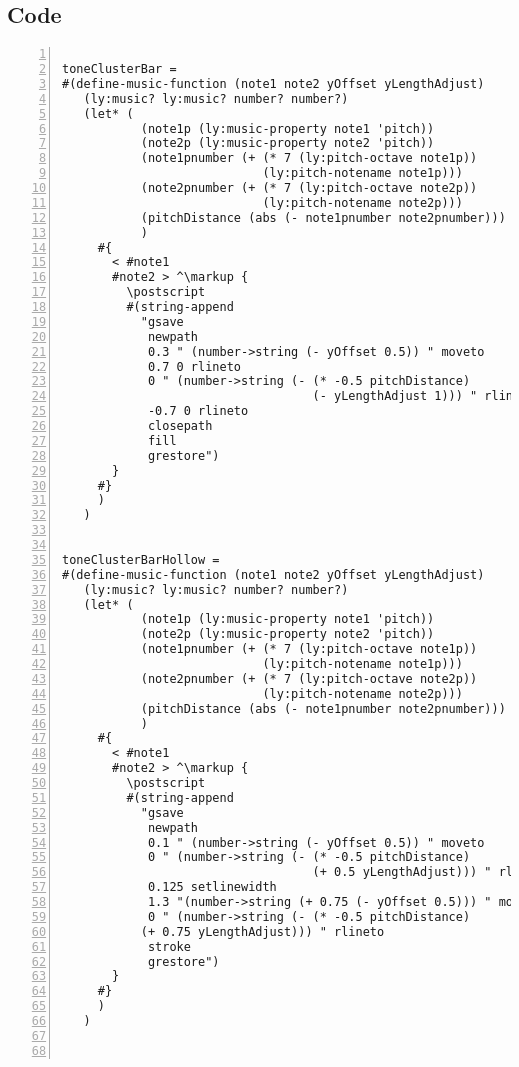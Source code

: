 \subsection{Code}
\begin{Verbatim}[numbers=left,xleftmargin=5mm]

toneClusterBar =
#(define-music-function (note1 note2 yOffset yLengthAdjust)
   (ly:music? ly:music? number? number?)
   (let* (
           (note1p (ly:music-property note1 'pitch))
           (note2p (ly:music-property note2 'pitch))
           (note1pnumber (+ (* 7 (ly:pitch-octave note1p))
                            (ly:pitch-notename note1p)))
           (note2pnumber (+ (* 7 (ly:pitch-octave note2p))
                            (ly:pitch-notename note2p)))
           (pitchDistance (abs (- note1pnumber note2pnumber)))
           )
     #{
       < #note1
       #note2 > ^\markup {
         \postscript
         #(string-append
           "gsave
            newpath
            0.3 " (number->string (- yOffset 0.5)) " moveto
            0.7 0 rlineto
            0 " (number->string (- (* -0.5 pitchDistance)
                                   (- yLengthAdjust 1))) " rlineto
            -0.7 0 rlineto
            closepath
            fill
            grestore")
       }
     #}
     )
   )


toneClusterBarHollow =
#(define-music-function (note1 note2 yOffset yLengthAdjust)
   (ly:music? ly:music? number? number?)
   (let* (
           (note1p (ly:music-property note1 'pitch))
           (note2p (ly:music-property note2 'pitch))
           (note1pnumber (+ (* 7 (ly:pitch-octave note1p))
                            (ly:pitch-notename note1p)))
           (note2pnumber (+ (* 7 (ly:pitch-octave note2p))
                            (ly:pitch-notename note2p)))
           (pitchDistance (abs (- note1pnumber note2pnumber)))
           )
     #{
       < #note1
       #note2 > ^\markup {
         \postscript
         #(string-append
           "gsave
            newpath
            0.1 " (number->string (- yOffset 0.5)) " moveto
            0 " (number->string (- (* -0.5 pitchDistance)
                                   (+ 0.5 yLengthAdjust))) " rlineto
            0.125 setlinewidth
            1.3 "(number->string (+ 0.75 (- yOffset 0.5))) " moveto
            0 " (number->string (- (* -0.5 pitchDistance)
           (+ 0.75 yLengthAdjust))) " rlineto
            stroke
            grestore")
       }
     #}
     )
   )



\end{Verbatim}
